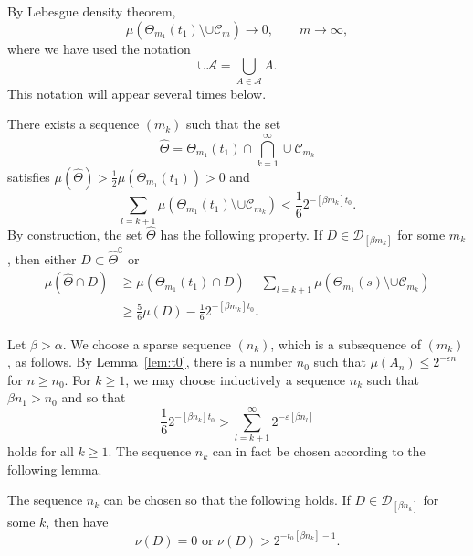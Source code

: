 By Lebesgue density theorem,
\[
\mu (\Theta_{m_1} (t_1) \setminus \cup \mathscr{C}_m) \to 0, \qquad m
\to \infty,
\]
where we have used the notation
\[
\cup \mathscr{A} = \bigcup_{A \in \mathscr{A}} A.
\]
This notation will appear several times below.

There exists a sequence $(m_k)$ such that the set
\[
\hat{\Theta} = \Theta_{m_1} (t_1) \cap \bigcap_{k=1}^\infty \cup \mathscr{C}_{m_k}
\]
satisfies $\mu (\hat{\Theta}) > \frac{1}{2} \mu (\Theta_{m_1} (t_1)) > 0$ and
\[
\sum_{l = k + 1} \mu (\Theta_{m_1} (t_1) \setminus \cup
\mathscr{C}_{m_k}) < \frac{1}{6} 2^{-[\beta m_k] t_0}.
\]
By construction, the set $\hat{\Theta}$ has the following property. If $D \in \mathscr{D}_{[\beta m_k]}$ for some $m_k$, then either $D
\subset \hat{\Theta}^\complement$ or
\begin{align}\label{eq:propertyofDelta}
\mu (\hat{\Theta} \cap D) &\geq \mu (\Theta_{m_1} (t_1) \cap D) -
\sum_{l = k + 1} \mu (\Theta_{m_1} (s) \setminus \cup
\mathscr{C}_{m_k}) \nonumber \\ &\geq \frac{5}{6} \mu (D) -
\frac{1}{6} 2^{-[\beta m_k] t_0}.
\end{align}

Let $\beta > \alpha$. We choose a sparse sequence $(n_k)$, which is a subsequence of $(m_k)$, as follows. By Lemma~\ref{lem:t0}, there is a number $n_0$ such that $\mu (A_n) \leq 2^{- \varepsilon n}$ for $n
\geq n_0$. For $k \geq 1$, we may choose inductively a sequence $n_k$ such that $\beta n_1 > n_0$ and so that
\begin{equation}\label{eq:nk}
\frac{1}{6} 2^{- [\beta n_k] t_0} > \sum_{l = k+1}^\infty 2^{- \varepsilon [\beta n_l]}
\end{equation}
holds for all $k \geq 1$. The sequence $n_k$ can in fact be chosen according to the following lemma.

\begin{lemm}\label{lem:nu}
The sequence $n_k$ can be chosen so that the following holds. If $D \in \mathscr{D}_{[\beta n_k]}$ for some $k$, then have
\[
\nu (D) = 0 \text{ or } \nu (D) > 2^{- t_0 [\beta n_k] - 1}.
\]
\end{lemm}

